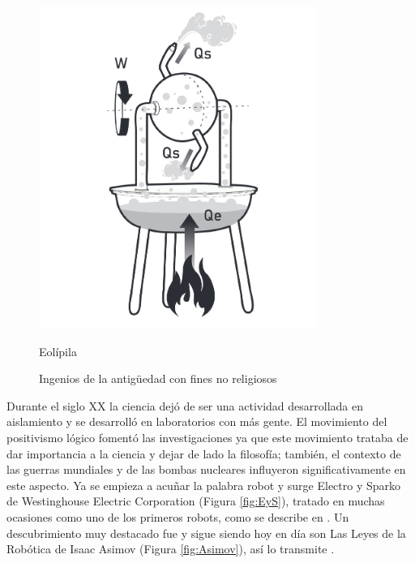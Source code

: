 \begin{figure}[ht!]
\begin{minipage}{0.3\linewidth}
		\includegraphics[width=\linewidth]{figs/eolipila.png}
		\caption*{\centering Eolípila} %
	\end{minipage}
	\caption{Ingenios de la antigüedad con fines no religiosos}
    \label{fig:ancient}
    \end{figure}

Durante el siglo XX la ciencia dejó de ser una actividad desarrollada en aislamiento y se desarrolló en laboratorios con más gente. El movimiento del positivismo lógico fomentó las investigaciones ya que este movimiento trataba de dar importancia a la ciencia y dejar de lado la filosofía; también, el contexto de las guerras mundiales y de las bombas nucleares influyeron significativamente en este aspecto. Ya se empieza a acuñar la palabra robot y surge Electro y Sparko de Westinghouse Electric Corporation (Figura \ref{fig:EyS}), tratado en muchas ocasiones como uno de los primeros robots, como se describe en \cite{bidaudrobots}. Un descubrimiento muy destacado fue y sigue siendo hoy en día son Las Leyes de la Robótica de Isaac Asimov (Figura \ref{fig:Asimov}), así lo transmite \cite{barcelo2004nuevo}.\\


